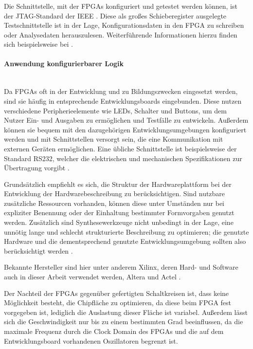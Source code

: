 \documentclass[11pt,a4paper,titlepage]{article}
\begin{document}
Die Schnittstelle, mit der FPGAs konfiguriert und getestet werden können, ist der JTAG-Standard der IEEE \cite[S. 190]{Reichardt}. Diese als großes Schieberegister ausgelegte Testschnittstelle ist in der Lage, Konfigurationsdaten in den FPGA zu schreiben oder Analysedaten herauszulesen. Weiterführende Informationen hierzu finden sich beispielsweise bei \cite[S. 221]{Furber}.  

\paragraph{Anwendung konfigurierbarer Logik}$\;$\\

Da FPGAs oft in der Entwicklung und zu Bildungszwecken eingesetzt werden, sind sie häufig in entsprechende Entwicklungsboards eingebunden. Diese nutzen verschiedene Peripherieelemente wie LEDs, Schalter und Buttons, um dem Nutzer Ein- und Ausgaben zu ermöglichen und Testfälle zu entwickeln. Außerdem können sie bequem mit den dazugehörigen Entwicklungsumgebungen konfiguriert werden und mit Schnittstellen versorgt sein, die eine Kommunikation mit externen Geräten ermöglichen. Eine übliche Schnittstelle ist beispielsweise der Standard RS232, welcher die elektrischen und mechanischen Spezifikationen zur Übertragung vorgibt \cite{Addison}.

Grundsätzlich empfiehlt es sich, die Struktur der Hardwareplattform bei der Entwicklung der Hardwarebeschreibung zu berücksichtigen. Sind nutzbare zusätzliche Ressourcen vorhanden, können diese unter Umständen nur bei expliziter Benennung oder der Einhaltung bestimmter Formvorgaben genutzt werden. Zusätzlich sind Synthesewerkzeuge nicht unbedingt in der Lage, eine unnötig lange und schlecht strukturierte Beschreibung zu optimieren; die genutzte Hardware und die dementsprechend genutzte Entwicklungsumgebung sollten also berücksichtigt werden \cite{Puschmann2}.

Bekannte Hersteller sind hier unter anderem Xilinx, deren Hard- und Software auch in dieser Arbeit verwendet werden, Altera und Actel \cite[S. 190]{Reichardt}.

Der Nachteil der FPGAs gegenüber gefertigten Schaltkreisen ist, dass keine Möglichkeit besteht, die Chipfläche zu optimieren, da diese beim FPGA fest vorgegeben ist, lediglich die Auslastung dieser Fläche ist variabel. Außerdem lässt sich die Geschwindigkeit nur bis zu einem bestimmten Grad beeinflussen, da die maximale Frequenz durch die Clock Domain des FPGAs und die auf dem Entwicklungsboard vorhandenen Oszillatoren begrenzt ist.
\end{document}
